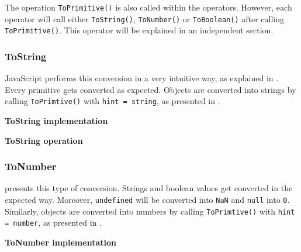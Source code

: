 The operation \texttt{ToPrimitive()} is also called within the operators. However, each operator will call either \texttt{ToString()}, \texttt{ToNumber()} or \texttt{ToBoolean()} after calling \texttt{ToPrimitive()}. This operator will be explained in an independent section.

\subsubsection{ToString}
JavaScript performs this conversion in a very intuitive way, as explained in . Every primitive gets converted as expected. Objects are converted into strings by calling \texttt{ToPrimtive()} with \texttt{hint = string}, as presented in .

\begin{code}
	\captionsetup{aboveskip=0pt, belowskip=10pt}
	\caption[ToString implementation]{\textbf{ToString implementation}}
	\label{code:background-to-string-implementation}
\end{code}

\begin{code}
	\captionsetup{aboveskip=0pt, belowskip=10pt}
	\caption[ToString operation]{\textbf{ToString operation}}
	\label{code:background-to-string-operation}
\end{code}

\subsubsection{ToNumber}
 presents this type of conversion. Strings and boolean values get converted in the expected way. Moreover, \texttt{undefined} will be converted into \texttt{NaN} and \texttt{null} into \texttt{0}. Similarly, objects are converted into numbers by calling \texttt{ToPrimtive()} with \texttt{hint = number}, as presented in .

\begin{code}
	\captionsetup{aboveskip=0pt, belowskip=10pt}
	\caption[ToNumber implementation]{\textbf{ToNumber implementation}}
	\label{code:background-to-number-implementation}
\end{code}

